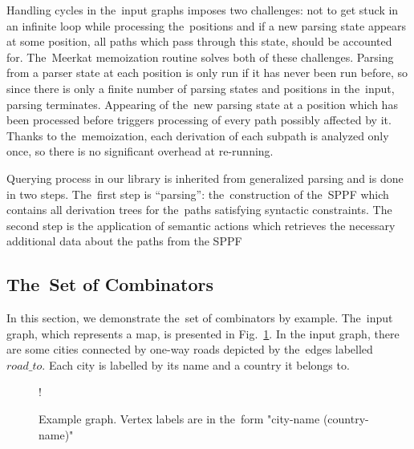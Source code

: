 Handling cycles in the~input graphs imposes two challenges: not to get stuck in an infinite loop while processing the~positions and if a new parsing state appears at some position, all paths which pass through this state, should be accounted for.
The~Meerkat memoization routine solves both of these challenges.
Parsing from a parser state at each position is only run if it has never been run before, so since there is only a finite number of parsing states and positions in the~input, parsing terminates.
Appearing of the~new parsing state at a position which has been processed before triggers processing of every path possibly affected by it.
Thanks to the~memoization, each derivation of each subpath is analyzed only once, so there is no significant overhead at re-running.


Querying process in our library is inherited from generalized parsing and is done in two steps.
The~first step is ``parsing'': the~construction of the~SPPF which contains all derivation trees for the~paths satisfying syntactic constraints.
The second step is the application of semantic actions which retrieves the necessary additional data about the paths from the SPPF

\subsection{The~Set of Combinators}

In this section, we demonstrate the~set of combinators by example. The~input graph, which represents a map, is presented in Fig.~\ref{fig:graph}.
In the input graph, there are some cities connected by one-way roads depicted by the~edges labelled $road\_to$.
Each city is labelled by its name and a country it belongs to.

\begin{figure}[h]
 {!}
{
}
\caption{Example graph. Vertex labels are in the~form "city-name (country-name)"}
\label{fig:graph}
\end{figure}


